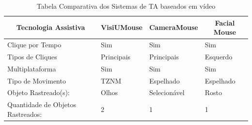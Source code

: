 \begin{table}[H]
\centering
\caption{Tabela Comparativa dos Sistemas de TA baseados em vídeo}
\label{tabela-comparativa}
\begin{tabular}{|l|l|l|l|}
\hline
\multicolumn{1}{|c|}{\textbf{Tecnologia Assistiva}} & \multicolumn{1}{c|}{\textbf{VisiUMouse}} & \multicolumn{1}{c|}{\textbf{CameraMouse}} & \multicolumn{1}{c|}{\textbf{Facial Mouse}} \\ \hline
Clique por Tempo                                     & \cellcolor[HTML]{67FD9A}Sim              & \cellcolor[HTML]{67FD9A}Sim                & \cellcolor[HTML]{67FD9A}Sim                \\ \hline
Tipos  de Cliques                                    & Principais                               & Principais                                 & Esquerdo                                   \\ \hline
Multiplataforma                                     & \cellcolor[HTML]{67FD9A}Sim              & \cellcolor[HTML]{67FD9A}Sim                & \cellcolor[HTML]{67FD9A}Sim                \\ \hline
Tipo de Movimento                                   & TZNM                                     & Espelhado                                  & Espelhado                                  \\ \hline
Objeto Rastreado(s):                                & Olhos                                    & Selecionável                              & Rosto                                      \\ \hline
Quantidade de Objetos Rastreados:                   & 2                                        & 1                                          & 1                                          \\ \hline
\end{tabular}
\end{table}

